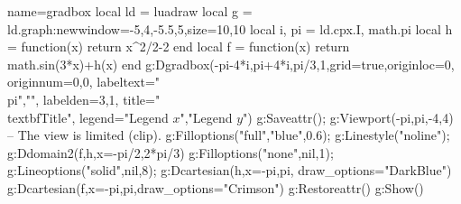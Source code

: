 \begin{luadraw}{name=gradbox}
local ld = luadraw
local g = ld.graph:new{window={-5,4,-5.5,5},size={10,10}}
local i, pi = ld.cpx.I, math.pi
local h = function(x) return x^2/2-2 end
local f = function(x) return math.sin(3*x)+h(x) end
g:Dgradbox({-pi-4*i,pi+4*i,pi/3,1},{grid=true,originloc=0, originnum={0,0}, labeltext={"\\pi",""},
labelden={3,1}, title="\\textbf{Title}", legend={"Legend $x$","Legend $y$"}})
g:Saveattr(); g:Viewport(-pi,pi,-4,4) -- The view is limited (clip).
g:Filloptions("full","blue",0.6); g:Linestyle("noline"); g:Ddomain2(f,h,{x={-pi/2,2*pi/3}})
g:Filloptions("none",nil,1); g:Lineoptions("solid",nil,8); g:Dcartesian(h,{x={-pi,pi}, draw_options="DarkBlue"})
g:Dcartesian(f,{x={-pi,pi},draw_options="Crimson"})
g:Restoreattr()
g:Show()
\end{luadraw}
